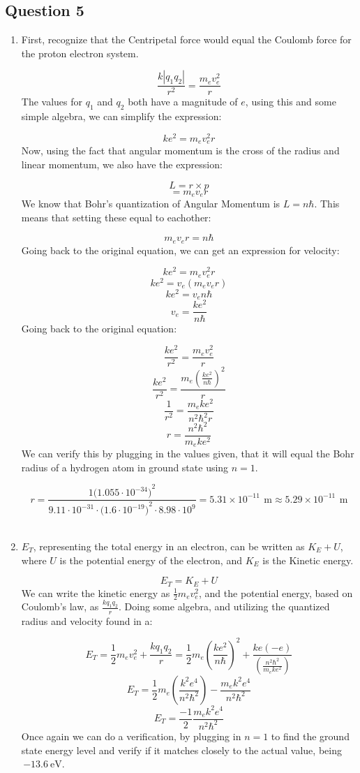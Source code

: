 \documentclass{article}
\begin{document}
\subsection*{Question 5}
\begin{enumerate}[label=\alph*)]
\item
First, recognize that the Centripetal force would equal the Coulomb force for the proton electron system.

\[\frac{k|q_1q_2|}{r^2} = \frac{m_ev_e^2}{r}\]
The values for $q_1$ and $q_2$ both have a magnitude of $e$, using this and some simple algebra, we can simplify the expression:

\[ke^2 = m_ev_e^2r\]
Now, using the fact that angular momentum is the cross of the radius and linear momentum, we also have the expression:

\[L=r\times{p}\]
\[=m_ev_er\]
We know that Bohr's quantization of Angular Momentum is $L = n\hbar$. This means that setting these equal to eachother:

\[m_ev_er = n\hbar\]
Going back to the original equation, we can get an expression for velocity:

\[ke^2 = m_ev_e^2r\]
\[ke^2 = v_e(m_ev_er)\]
\[ke^2 = v_en\hbar\]
\[v_e = \frac{ke^2}{n\hbar}\]
Going back to the original equation:

\[\frac{ke^2}{r^2} = \frac{m_ev_e^2}{r}\]
\[\frac{ke^2}{r^2} = \frac{m_e(\frac{ke^2}{n\hbar})^2}{r}\]
\[\frac{1}{r^2} = \frac{m_eke^2}{n^2\hbar^2r}\]
\[r = \frac{n^2\hbar^2}{m_eke^2}\]
We can verify this by plugging in the values given, that it will equal the Bohr radius of a hydrogen atom in ground state using $n=1$.

\[r = \frac{1{(1.055\cdot{10^{-34})}^2}}{9.11\cdot{10^{-31}}\cdot{(1.6\cdot{10^{-19})}^2} \cdot{8.98 \cdot{10^{9}}}} =5.31\times{10^{-11}}\,\SI{}{\meter} \approx 5.29\times{10^{-11}}\,\SI{}{\meter}\]
\\
\item
$E_T$, representing the total energy in an electron, can be written as $K_E + U$, where $U$ is the potential energy of the electron, and $K_E$ is the Kinetic energy.

\[E_T = K_E + U\]
We can write the kinetic energy as $\frac{1}{2}m_ev_e^2$, and the potential energy, based on Coulomb's law, as $\frac{kq_1q_2}{r}$. Doing some algebra, and utilizing the quantized radius and velocity found in a:

\[E_T = \frac{1}{2}m_ev_e^2 + \frac{kq_1q_2}{r} = \frac{1}{2}m_e(\frac{ke^2}{n\hbar})^2 + \frac{ke(-e)}{(\frac{n^2\hbar^2}{m_eke^2})}\]
\[E_T = \frac{1}{2}m_e(\frac{k^2e^4}{n^2\hbar^2}) - \frac{m_ek^2e^4}{n^2\hbar^2}\]
\[E_T = \frac{-1}{2}\frac{m_ek^2e^4}{n^2\hbar^2}\]
Once again we can do a verification, by plugging in $n=1$ to find the ground state energy level and verify if it matches closely to the actual value, being $\,\SI{-13.6}{\electronvolt}$.


\end{enumerate}
\end{document}
